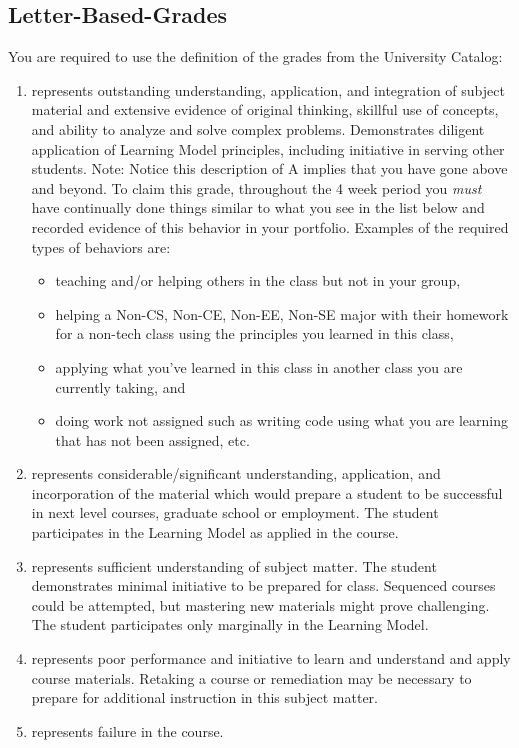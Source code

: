\documentclass[12pt]{amsart}
\begin{document}
\subsection{Letter-Based-Grades}You are required to use the definition of the grades from the University Catalog:
\begin{enumerate}[label=\textbf{\Alph*}]
	\item represents outstanding understanding, application, and integration of subject material and extensive evidence of original thinking, skillful use of concepts, and ability to analyze and solve complex problems. Demonstrates diligent application of Learning Model principles, including initiative in serving other students.
	Note: Notice this description of A implies that you have gone above and beyond. To claim this grade, throughout the 4 week period you \textit{must} have continually done things similar to what you see in the list below  and recorded evidence of this behavior in your portfolio. 
Examples of the required types of behaviors are:
\begin{itemize}  
\item teaching and/or helping others in the class but not in your group,
\item helping a Non-CS, Non-CE, Non-EE, Non-SE major with their homework for a non-tech class using the principles you learned in this class,
\item applying what you've learned in this class in another class you are currently taking, and
\item doing work not assigned such as writing code using what you are learning that has not been assigned, etc.
\end{itemize}

	\item represents considerable/significant understanding, application, and incorporation of the material which would prepare a student to be successful in next level courses, graduate school or employment. The student participates in the Learning Model as applied in the course. 
	\item represents sufficient understanding of subject matter. The student demonstrates minimal initiative to be prepared for class. Sequenced courses could be attempted, but mastering new materials might prove challenging. The student participates only marginally in the Learning Model.
	\item represents poor performance and initiative to learn and understand and apply course materials. Retaking a course or remediation may be necessary to prepare for additional instruction in this subject matter. 
	\item represents failure in the course.
\end{enumerate}
\end{document}
